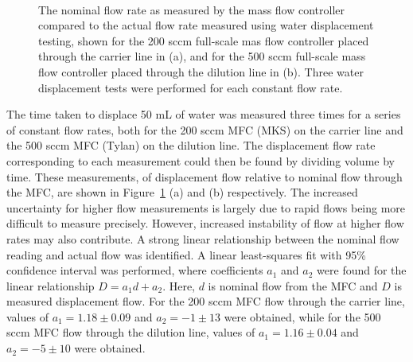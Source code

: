 \documentclass[
  a4paper,
]{scrbook}
\begin{document}
\begin{figure}
\begin{minipage}[t]{0.45\linewidth}
{{}

}

\end{minipage}%
%
\begin{minipage}[t]{0.01\linewidth}

{\centering 

~

}

\end{minipage}%

\caption{\label{fig-MFC-calibration-curves}The nominal flow rate as
measured by the mass flow controller compared to the actual flow rate
measured using water displacement testing, shown for the 200 sccm
full-scale mas flow controller placed through the carrier line in (a),
and for the 500 sccm full-scale mass flow controller placed through the
dilution line in (b). Three water displacement tests were performed for
each constant flow rate.}

\end{figure}

The time taken to displace 50 mL of water was measured three times for a
series of constant flow rates, both for the 200 sccm MFC (MKS) on the
carrier line and the 500 sccm MFC (Tylan) on the dilution line. The
displacement flow rate corresponding to each measurement could then be
found by dividing volume by time. These measurements, of displacement
flow relative to nominal flow through the MFC, are shown in
Figure~\ref{fig-MFC-calibration-curves} (a) and (b) respectively. The
increased uncertainty for higher flow measurements is largely due to
rapid flows being more difficult to measure precisely. However,
increased instability of flow at higher flow rates may also contribute.
A strong linear relationship between the nominal flow reading and actual
flow was identified. A linear least-squares fit with 95\% confidence
interval was performed, where coefficients \(a_1\) and \(a_2\) were
found for the linear relationship \(D = a_1d + a_2\). Here, \(d\) is
nominal flow from the MFC and \(D\) is measured displacement flow. For
the 200 sccm MFC flow through the carrier line, values of
\(a_1 = 1.18\pm0.09\) and \(a_2 = -1\pm13\) were obtained, while for the
500 sccm MFC flow through the dilution line, values of
\(a_1 = 1.16\pm0.04\) and \(a_2 = -5\pm10\) were obtained.
\end{document}
